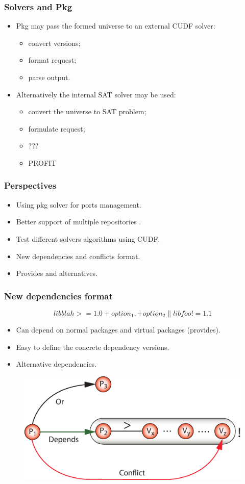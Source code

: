 \documentclass{beamer}
\begin{document}
\begin{frame}
\frametitle{Solvers and Pkg}
\begin{itemize}
  \item Pkg may pass the formed universe to an external CUDF solver:
  \begin{itemize}
    \item convert versions;
    \item format request;
    \item parse output.
  \end{itemize}
  \item Alternatively the internal SAT solver may be used:
  \begin{itemize}
    \item convert the universe to SAT problem;
    \item formulate request;
    \item ???
    \item PROFIT
  \end{itemize} 
\end{itemize}
\end{frame}

\begin{frame}
\frametitle{Perspectives}

\begin{itemize}
  \item Using pkg solver for ports management.
  \item Better support of multiple repositories .
  \item Test different solvers algorithms using CUDF.
  \item New dependencies and conflicts format.
  \item Provides and alternatives.
\end{itemize}
\end{frame}

\begin{frame}
\frametitle{New dependencies format}
\large{\[libblah >= 1.0 +option_1, +option_2 \| libfoo != 1.1\]}
\begin{itemize}
  \item Can depend on normal packages and virtual packages (provides).
  \item Easy to define the concrete dependency versions.
  \item Alternative dependencies.
\end{itemize}
\begin{figure}[h!]
  \centering
  \includegraphics[height=0.3\textheight]{q6.eps}
\end{figure}
\end{frame}
\end{document}
